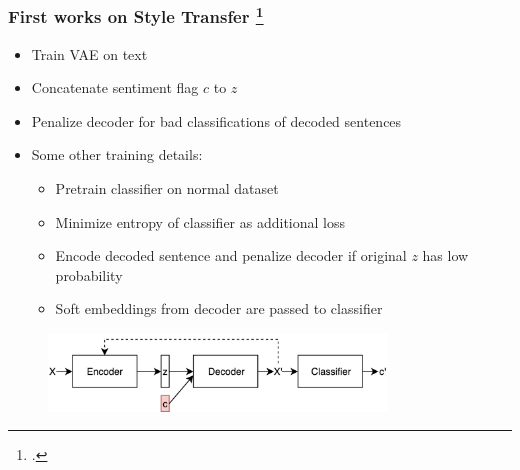 \documentclass[10pt]{beamer}
\begin{document}
\begin{frame}
\frametitle{First works on Style Transfer \footcite{TowardControlledGenerationOfText}}

\begin{itemize}
    \item Train VAE on text
    \item Concatenate sentiment flag $c$ to $z$
    \item Penalize decoder for bad classifications of decoded sentences
    \item Some other training details:
    \begin{itemize}
        \item Pretrain classifier on normal dataset
        \item Minimize entropy of classifier as additional loss
        \item Encode decoded sentence and penalize decoder if original $z$ has low probability
        \item Soft embeddings from decoder are passed to classifier
    \end{itemize} 
\end{itemize}

\begin{figure}
\centering
\includegraphics[width=0.8\textwidth]{images/controlled-generation}
\end{figure}
\end{frame}
\end{document}
